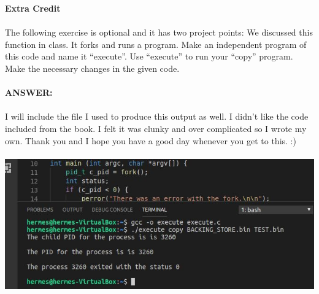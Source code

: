 \documentclass[12pt]{article}
\begin{document}
\textbf{Extra Credit}\\\\
The following exercise is optional and it has two project points: We 
discussed this function in class. It forks and runs a program. Make 
an independent program of this code and name it “execute”. Use “execute” 
to run your “copy” program. Make the necessary changes in the given 
code.\\\\
\textbf{ANSWER: }\\\\
I will include the file I used to produce this output as well. I didn't 
like the code included from the book. I felt it was clunky and over complicated 
so I wrote my own. Thank you and I hope you have a good day whenever you get to 
this. :)\\\\
\includegraphics[width=1\textwidth]{extracredit.jpg}\\
\end{document}
